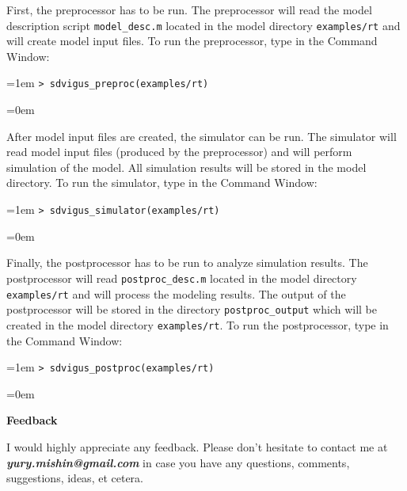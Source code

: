 \documentclass[a4paper,onesided,12pt]{letter}
\begin{document}
\begin{list}{}{\leftmargin=1em}
First, the preprocessor has to be run. The preprocessor will read the model description script \texttt{model\_desc.m} located in the model directory \texttt{examples/rt} and will create model input files. To run the preprocessor, type in the Command Window:

\leftskip=1em \texttt{\textgreater\ sdvigus\_preproc(\textquotesingle examples/rt\textquotesingle)}

\leftskip=0em

After model input files are created, the simulator can be run. The simulator will read model input files (produced by the preprocessor) and will perform simulation of the model. All simulation results will be stored in the model directory. To run the simulator, type in the Command Window:

\leftskip=1em \texttt{\textgreater\ sdvigus\_simulator(\textquotesingle examples/rt\textquotesingle)}

\leftskip=0em

Finally, the postprocessor has to be run to analyze simulation results. The postprocessor will read \texttt{postproc\_desc.m} located in the model directory \texttt{examples/rt} and will process the modeling results. The output of the postprocessor will be stored in the directory \texttt{postproc\_output} which will be created in the model directory \texttt{examples/rt}. To run the postprocessor, type in the Command Window:

\leftskip=1em \texttt{\textgreater\ sdvigus\_postproc(\textquotesingle examples/rt\textquotesingle)}

\leftskip=0em

\item \textbf{Feedback}

I would highly appreciate any feedback. Please don't hesitate to contact me at \textsl{\textbf{yury.mishin@gmail.com}} in case you have any questions, comments, suggestions, ideas, et cetera.

\end{list}
\end{document}
